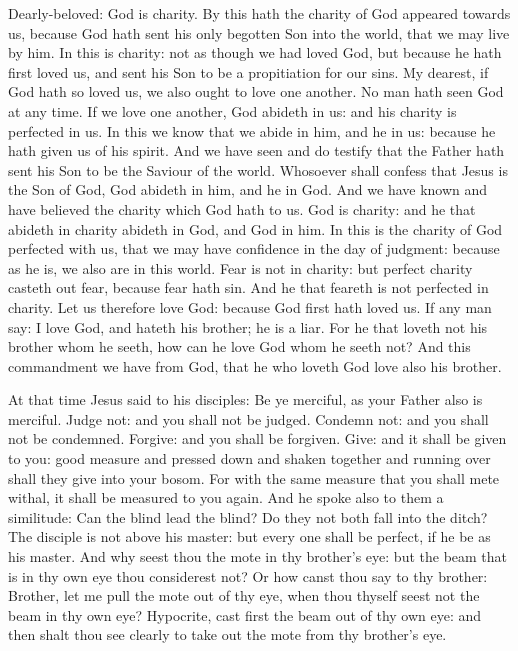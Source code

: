 Dearly-beloved: %
God is charity.  By this hath the
charity of God appeared towards us, because God hath sent his only begotten Son
into the world, that we may live by him.  In this is charity: not as though we
had loved God, but because he hath first loved us, and sent his Son to be a
propitiation for our sins.  My dearest, if God hath so loved us, we also ought
to love one another.  No man hath seen God at any time. If we love one another,
God abideth in us: and his charity is perfected in us.  In this we know that we
abide in him, and he in us: because he hath given us of his spirit.  And we
have seen and do testify that the Father hath sent his Son to be the Saviour of
the world.  Whosoever shall confess that Jesus is the Son of God, God abideth
in him, and he in God.  And we have known and have believed the charity which
God hath to us. God is charity: and he that abideth in charity abideth in God,
and God in him.  In this is the charity of God perfected with us, that we may
have confidence in the day of judgment: because as he is, we also are in this
world.  Fear is not in charity: but perfect charity casteth out fear, because
fear hath sin. And he that feareth is not perfected in charity.
 Let us therefore love God: because God
first hath loved us.  If any man say: I love God, and hateth his brother; he is
a liar.  For he that loveth not his brother whom he seeth, how can he love God
whom he seeth not?  And this commandment we have from God, that he who loveth
God love also his brother.



At that time Jesus said to his disciples:
Be ye merciful, as your Father also is merciful.  Judge not: and you
shall not be judged. Condemn not: and you shall not be condemned. Forgive: and
you shall be forgiven.  Give: and it shall be given to you: good measure and
pressed down and shaken together and running over shall they give into your
bosom.  For with the same measure that you shall mete withal, it shall be
measured to you again.  And he spoke also to them a similitude: Can the blind
lead the blind? Do they not both fall into the ditch?  The disciple is not
above his master: but every one shall be perfect, if he be as his master.  And
why seest thou the mote in thy brother's eye: but the beam that is in thy own
eye thou considerest not?  Or how canst thou say to thy brother: Brother, let
me pull the mote out of thy eye, when thou thyself seest not the beam in thy
own eye? Hypocrite, cast first the beam out of thy own eye: and then shalt thou
see clearly to take out the mote from thy brother's eye.


